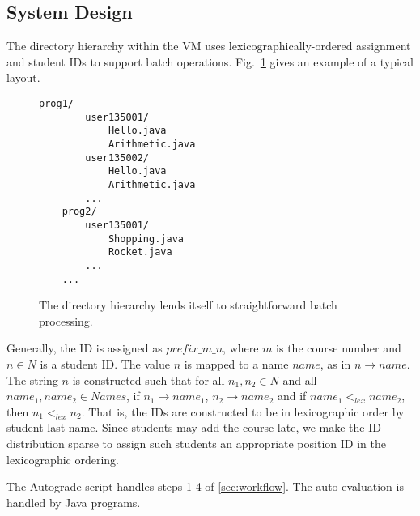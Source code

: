 \subsection{System Design}

The directory hierarchy within the VM uses lexicographically-ordered assignment
and student IDs to support batch operations. Fig.~\ref{fig:layout} gives an example of
a typical layout.

\begin{figure}
  \begin{Verbatim}[frame=single]
    prog1/
        user135001/
            Hello.java
            Arithmetic.java
        user135002/
            Hello.java
            Arithmetic.java
        ...
    prog2/
        user135001/
            Shopping.java
            Rocket.java
        ...
    ...
\end{Verbatim}
  \caption{The directory hierarchy lends itself to straightforward batch processing.}
  \label{fig:layout}
\end{figure}

Generally, the ID is assigned as $prefix\_m\_n$, where $m$ is the course number
and $n \in N$ is a student ID.  The value $n$ is mapped to a name $name$, as in
$n \rightarrow name$. The string $n$ is constructed such that for all $n_1, n_2
\in N$ and all $name_1, name_2 \in Names$, if $n_1 \rightarrow name_1$, $n_2
\rightarrow name_2$ and if $name_1 <_{lex} name_2$, then $n_1 <_{lex} n_2$.
That is, the IDs are constructed to be in lexicographic order by student last
name.  Since students may add the course late, we make the ID distribution
sparse to assign such students an appropriate position ID in the lexicographic
ordering.  

The Autograde script handles steps 1-4 of \ref{sec:workflow}. The auto-evaluation
is handled by Java programs. 

